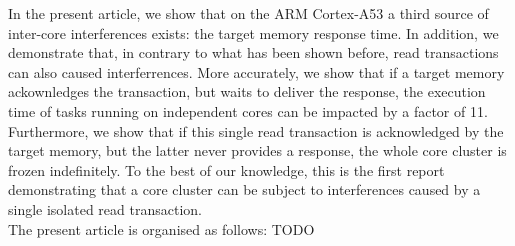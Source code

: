     In the present article, we show that on the ARM Cortex-A53 \cite{ARM-cortex-A53} a third source of inter-core interferences exists: the target memory response time. In addition, we demonstrate that, in contrary to what has been shown before, read transactions can also caused interferrences. More accurately, we show that if a target memory ackownledges the transaction, but waits to deliver the response, the execution time of tasks running on independent cores can be impacted by a factor of 11. Furthermore, we show that if this single read transaction is acknowledged by the target memory, but the latter never provides a response, the whole core cluster is frozen indefinitely. To the best of our knowledge, this is the first report demonstrating that a core cluster can be subject to interferences caused by a single isolated read transaction.\\

    The present article is organised as follows: TODO
